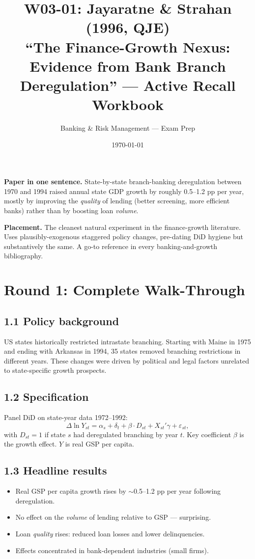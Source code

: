 \documentclass[11pt]{article}
\title{W03-01: Jayaratne \& Strahan (1996, QJE) \\
\large ``The Finance-Growth Nexus: Evidence from Bank Branch Deregulation'' --- Active Recall Workbook}
\author{Banking \& Risk Management --- Exam Prep}
\date{\today}
\begin{document}
\maketitle

\begin{keybox}
\textbf{Paper in one sentence.} State-by-state branch-banking deregulation between 1970 and 1994 raised annual state GDP growth by roughly 0.5--1.2 pp per year, mostly by improving the \emph{quality} of lending (better screening, more efficient banks) rather than by boosting loan \emph{volume}.

\textbf{Placement.} The cleanest natural experiment in the finance-growth literature. Uses plausibly-exogenous staggered policy changes, pre-dating DiD hygiene but substantively the same. A go-to reference in every banking-and-growth bibliography.
\end{keybox}

\section*{Round 1: Complete Walk-Through}

\subsection*{1.1 Policy background}
US states historically restricted intrastate branching. Starting with Maine in 1975 and ending with Arkansas in 1994, 35 states removed branching restrictions in different years. These changes were driven by political and legal factors unrelated to state-specific growth prospects.

\subsection*{1.2 Specification}
Panel DiD on state-year data 1972--1992:
\[
\Delta\ln Y_{st}=\alpha_s+\delta_t+\beta\cdot D_{st}+X_{st}'\gamma+\varepsilon_{st},
\]
with $D_{st}=1$ if state $s$ had deregulated branching by year $t$. Key coefficient $\beta$ is the growth effect. $Y$ is real GSP per capita.

\subsection*{1.3 Headline results}
\begin{itemize}
\item Real GSP per capita growth rises by $\sim$0.5--1.2 pp per year following deregulation.
\item No effect on the \emph{volume} of lending relative to GSP --- surprising.
\item Loan \emph{quality} rises: reduced loan losses and lower delinquencies.
\item Effects concentrated in bank-dependent industries (small firms).
\end{itemize}
\end{document}
